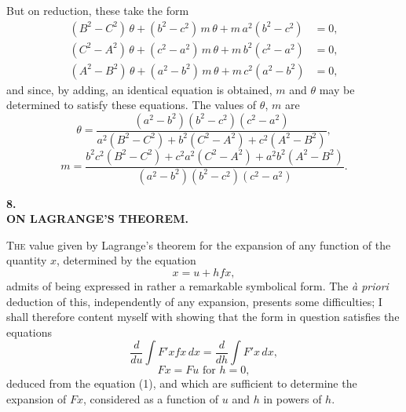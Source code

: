 \documentclass[11pt]{article}
\begin{document}
But on reduction, these take the form
\[
\begin{aligned}
(B^2 - C^2)\,\theta + (b^2 - c^2)\,m\,\theta + m\,a^2(b^2 - c^2) &= 0, \\
(C^2 - A^2)\,\theta + (c^2 - a^2)\,m\,\theta + m\,b^2(c^2 - a^2) &= 0, \\
(A^2 - B^2)\,\theta + (a^2 - b^2)\,m\,\theta + m\,c^2(a^2 - b^2) &= 0,
\end{aligned}
\tag{32}
\]
and since, by adding, an identical equation is obtained, $m$ and $\theta$ may be determined to satisfy these equations. The values of $\theta$, $m$ are
\[
\theta = \frac{(a^2 - b^2)(b^2 - c^2)(c^2 - a^2)}{a^2(B^2 - C^2) + b^2(C^2 - A^2) + c^2(A^2 - B^2)} \tag{33},
\]
\[
m = \frac{b^2 c^2(B^2 - C^2) + c^2 a^2(C^2 - A^2) + a^2 b^2(A^2 - B^2)}{(a^2 - b^2)(b^2 - c^2)(c^2 - a^2)} \tag{34}.
\]

\bigskip

\begin{center}
\large\textbf{8.}\\[6pt]
\large\textbf{ON LAGRANGE'S THEOREM.}
\end{center}


\medskip

\noindent\textsc{The} value given by Lagrange's theorem for the expansion of any function of the quantity $x$, determined by the equation
\[
x = u + h f x \tag{1},
\]
admits of being expressed in rather a remarkable symbolical form. The \textit{\`a priori} deduction of this, independently of any expansion, presents some difficulties; I shall therefore content myself with showing that the form in question satisfies the equations
\[
\frac{d}{du}\int F'x f x\,dx = \frac{d}{dh}\int F'x\,dx \tag{2},
\]
\[
Fx = Fu \text{ for } h = 0 \tag{3},
\]
deduced from the equation (1), and which are sufficient to determine the expansion of $Fx$, considered as a function of $u$ and $h$ in powers of $h$.
\end{document}
